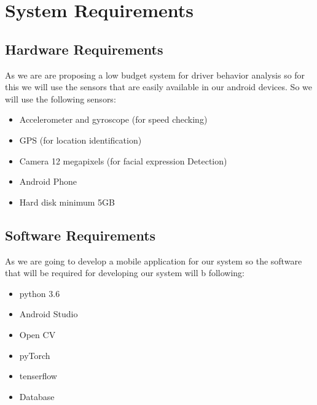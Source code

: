 \chapter{System Requirements}
\section{Hardware Requirements}
As we are are proposing a low budget system for driver behavior analysis so for this we will use
the sensors that are easily available in our android devices. So we will use the following
sensors:
\begin{itemize}
      \item Accelerometer and gyroscope (for speed checking)
    \item GPS (for location identification)
    \item Camera 12 megapixels (for facial expression Detection)
    \item Android Phone
    \item Hard disk minimum 5GB
\end{itemize}
  
    


\section{Software Requirements}
As we are going to develop a mobile application for our system so the software that will be
required for developing our system will b following:
\begin{itemize}
      \item python 3.6
    \item Android Studio
    \item Open CV
    \item pyTorch
    \item tenserflow
    \item Database
\end{itemize}
  
    
